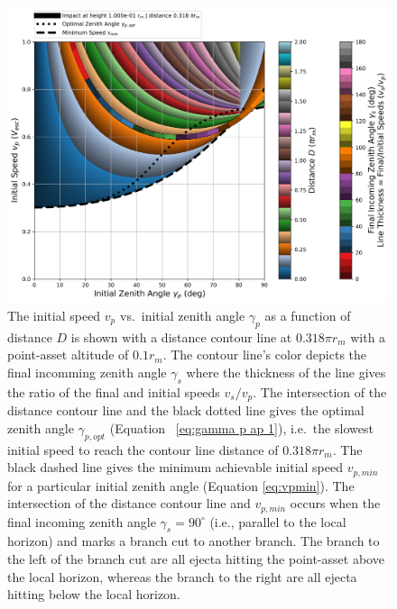 \documentclass{article}
\begin{document}
\begin{figure}[!htb]
	\centering
	\includegraphics[width=1.0\linewidth]{dist_speed_zenith_plot_022_1.000e-01_1.000.png}
	\caption{The initial speed $v_p$ vs.\ initial zenith angle $\gamma_p$ as a function of distance $D$ is shown with a distance contour line at $0.318\pi r_m$ with a point-asset altitude of $0.1 r_m$. The contour line's color depicts the final incomming zenith angle $\gamma_s$ where the thickness of the line gives the ratio of the final and initial speeds $v_s/v_p$. The intersection of the distance contour line and the black dotted line gives the optimal zenith angle $\gamma_{p,opt}$ (Equation~
		\eqref{eq:gamma p ap 1}), i.e.\ the slowest initial speed to reach the contour line distance of $0.318\pi r_m$. The black dashed line gives the minimum achievable initial speed $v_{p,min}$ for a particular initial zenith angle (Equation \eqref{eq:vpmin}). The intersection of the distance contour line and $v_{p,min}$ occurs when the final incoming zenith angle $\gamma_s = 90^\circ$ (i.e., parallel to the local horizon) and marks a branch cut to another branch. The branch to the left of the branch cut are all ejecta hitting the point-asset above the local horizon, whereas the branch to the right are all ejecta hitting below the local horizon.}\label{fig:dist_speed_zenith_plot_022_1.000e-01_1.000}
\end{figure}
\end{document}
